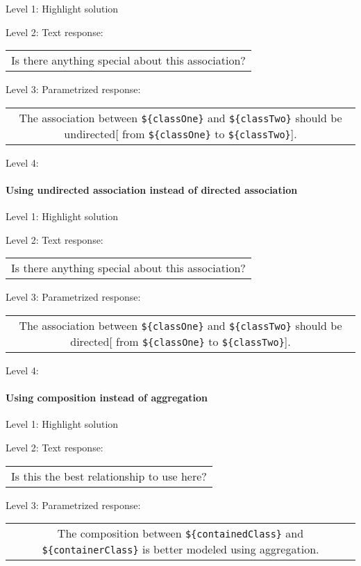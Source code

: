 \noindent Level 1: Highlight solution \medskip

\noindent Level 2: Text response: \medskip

\begin{tabular}{|c}
Is there anything special about this association?
\end{tabular} \medskip

\noindent Level 3: Parametrized response: \medskip

\begin{tabular}{|c}
The association between \verb|${classOne}| and \verb|${classTwo}| should be undirected[ from \verb|${classOne}| to \verb|${classTwo}|].
\end{tabular} \medskip

\noindent Level 4: 
\paragraph{Using undirected association instead of directed association}

\noindent Level 1: Highlight solution \medskip

\noindent Level 2: Text response: \medskip

\begin{tabular}{|c}
Is there anything special about this association?
\end{tabular} \medskip

\noindent Level 3: Parametrized response: \medskip

\begin{tabular}{|c}
The association between \verb|${classOne}| and \verb|${classTwo}| should be directed[ from \verb|${classOne}| to \verb|${classTwo}|].
\end{tabular} \medskip

\noindent Level 4: 
\paragraph{Using composition instead of aggregation}

\noindent Level 1: Highlight solution \medskip

\noindent Level 2: Text response: \medskip

\begin{tabular}{|c}
Is this the best relationship to use here?
\end{tabular} \medskip

\noindent Level 3: Parametrized response: \medskip

\begin{tabular}{|c}
The composition between \verb|${containedClass}| and \verb|${containerClass}| is better modeled using aggregation.
\end{tabular} \medskip

